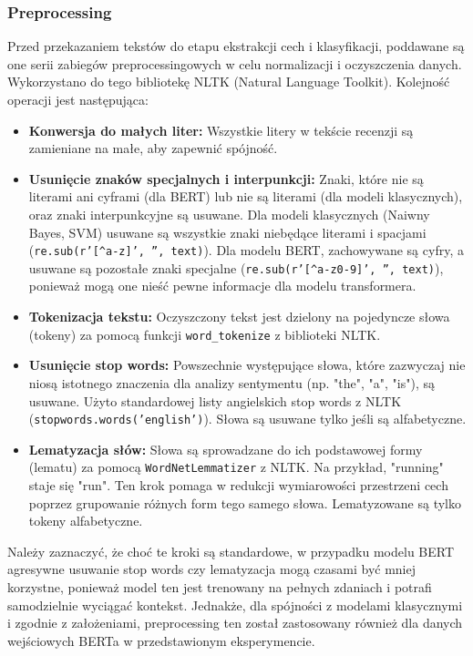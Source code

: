 \documentclass[runningheads]{llncs}
\begin{document}
\subsubsection{Preprocessing}
Przed przekazaniem tekstów do etapu ekstrakcji cech i klasyfikacji, poddawane są one serii zabiegów preprocessingowych w celu normalizacji i oczyszczenia danych. Wykorzystano do tego bibliotekę NLTK (Natural Language Toolkit). Kolejność operacji jest następująca:
\begin{itemize}
    \item \textbf{Konwersja do małych liter:} Wszystkie litery w tekście recenzji są zamieniane na małe, aby zapewnić spójność.
    \item \textbf{Usunięcie znaków specjalnych i interpunkcji:} Znaki, które nie są literami ani cyframi (dla BERT) lub nie są literami (dla modeli klasycznych), oraz znaki interpunkcyjne są usuwane. Dla modeli klasycznych (Naiwny Bayes, SVM) usuwane są wszystkie znaki niebędące literami i spacjami (\texttt{re.sub(r'[^a-z\s]', '', text)}). Dla modelu BERT, zachowywane są cyfry, a usuwane są pozostałe znaki specjalne (\texttt{re.sub(r'[^a-z0-9\s]', '', text)}), ponieważ mogą one nieść pewne informacje dla modelu transformera.
    \item \textbf{Tokenizacja tekstu:} Oczyszczony tekst jest dzielony na pojedyncze słowa (tokeny) za pomocą funkcji \texttt{word\_tokenize} z biblioteki NLTK.
    \item \textbf{Usunięcie stop words:} Powszechnie występujące słowa, które zazwyczaj nie niosą istotnego znaczenia dla analizy sentymentu (np. "the", "a", "is"), są usuwane. Użyto standardowej listy angielskich stop words z NLTK (\texttt{stopwords.words('english')}). Słowa są usuwane tylko jeśli są alfabetyczne.
    \item \textbf{Lematyzacja słów:} Słowa są sprowadzane do ich podstawowej formy (lematu) za pomocą \texttt{WordNetLemmatizer} z NLTK. Na przykład, "running" staje się "run". Ten krok pomaga w redukcji wymiarowości przestrzeni cech poprzez grupowanie różnych form tego samego słowa. Lematyzowane są tylko tokeny alfabetyczne.
\end{itemize}
Należy zaznaczyć, że choć te kroki są standardowe, w przypadku modelu BERT agresywne usuwanie stop words czy lematyzacja mogą czasami być mniej korzystne, ponieważ model ten jest trenowany na pełnych zdaniach i potrafi samodzielnie wyciągać kontekst. Jednakże, dla spójności z modelami klasycznymi i zgodnie z założeniami, preprocessing ten został zastosowany również dla danych wejściowych BERTa w przedstawionym eksperymencie.
\end{document}
